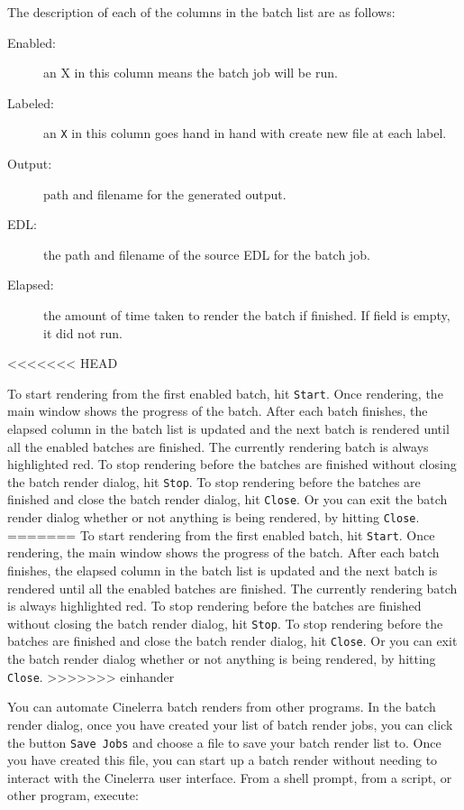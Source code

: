 The description of each of the columns in the batch list are as follows:

\begin{description}
    \item[Enabled:] an X in this column means the batch job will be run.
    \item[Labeled:] an \texttt{X} in this column goes hand in hand with create new file at each label.
    \item[Output:] path and filename for the generated output.
    \item[EDL:] the path and filename of the source EDL for the batch job.
    \item[Elapsed:] the amount of time taken to render the batch if finished.  If field is empty, it did not run.
\end{description}
<<<<<<< HEAD

\noindent To start rendering from the first enabled batch, hit \texttt{Start}.  Once rendering, the main window shows the progress of the batch. After each batch finishes, the elapsed column in the batch list is updated and the next batch is rendered until all the enabled batches are finished.  The currently rendering batch is always highlighted red.  To stop rendering before the batches are finished without closing the batch render dialog, hit \texttt{Stop}.  To stop rendering before the batches are finished and close the batch render dialog, hit \texttt{Close}.  Or you can exit the batch render dialog whether or not anything is being rendered, by hitting \texttt{Close}.
=======
To start rendering from the first enabled batch, hit \texttt{Start}.  Once rendering, the main window shows the progress of the batch. After each batch finishes, the elapsed column in the batch list is updated and the next batch is rendered until all the enabled batches are finished.  The currently rendering batch is always highlighted red.  To stop rendering before the batches are finished without closing the batch render dialog, hit \texttt{Stop}.  To stop rendering before the batches are finished and close the batch render dialog, hit \texttt{Close}.  Or you can exit the batch render dialog whether or not anything is being rendered, by hitting \texttt{Close}.
>>>>>>> einhander

You can automate Cinelerra batch renders from other programs.  In the batch render dialog, once you have created your list of batch render jobs, you can click the button \texttt{Save Jobs} and choose a file to save your batch render list to.  Once you have created this file, you can start up a batch render without needing to interact with the Cinelerra user interface.  From a shell prompt, from a script, or other program, execute:

